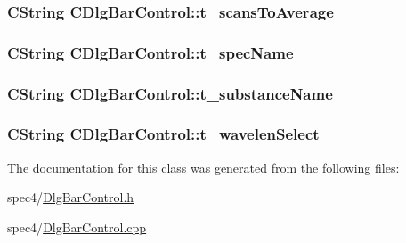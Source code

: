 \label{classCDlgBarControl_a3a07b30cb91e4afa29c7b56eae3b13cf}
\hypertarget{classCDlgBarControl_a2fa3398d7e2a24fd7d430a49651e59ba}{
\subsubsection[{t\_\-scansToAverage}]{\setlength{\rightskip}{0pt plus 5cm}CString {\bf CDlgBarControl::t\_\-scansToAverage}}}
\label{classCDlgBarControl_a2fa3398d7e2a24fd7d430a49651e59ba}
\hypertarget{classCDlgBarControl_a9e37906ad82cc1feac6c1bf4e89913ed}{
\subsubsection[{t\_\-specName}]{\setlength{\rightskip}{0pt plus 5cm}CString {\bf CDlgBarControl::t\_\-specName}}}
\label{classCDlgBarControl_a9e37906ad82cc1feac6c1bf4e89913ed}
\hypertarget{classCDlgBarControl_a2bcba70acd6f14afe83895d7691205a8}{
\subsubsection[{t\_\-substanceName}]{\setlength{\rightskip}{0pt plus 5cm}CString {\bf CDlgBarControl::t\_\-substanceName}}}
\label{classCDlgBarControl_a2bcba70acd6f14afe83895d7691205a8}
\hypertarget{classCDlgBarControl_ab8367952cb5f8d8502f50bfab868d79a}{
\subsubsection[{t\_\-wavelenSelect}]{\setlength{\rightskip}{0pt plus 5cm}CString {\bf CDlgBarControl::t\_\-wavelenSelect}}}
\label{classCDlgBarControl_ab8367952cb5f8d8502f50bfab868d79a}


The documentation for this class was generated from the following files:\begin{DoxyCompactItemize}
\item 
spec4/\hyperlink{DlgBarControl_8h}{DlgBarControl.h}\item 
spec4/\hyperlink{DlgBarControl_8cpp}{DlgBarControl.cpp}\end{DoxyCompactItemize}
